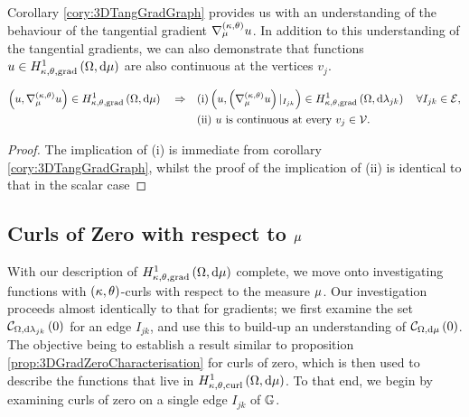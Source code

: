 Corollary \ref{cory:3DTangGradGraph} provides us with an understanding of the behaviour of the tangential gradient $\nabla^{\left( \kappa, \theta \right)}_{\mu}u$.
In addition to this understanding of the tangential gradients, we can also demonstrate that functions $u\in H^1_{\kappa,\theta,\mathrm{grad}}\left( \Omega, \mathrm{d}\mu \right)$ are also continuous at the vertices $v_j$.
\begin{prop} \label{prop:3DVertexContinuity-Grad}
	\begin{align*}
		\left( u, \nabla^{\left( \kappa, \theta \right)}_{\mu}u \right)\in H^1_{\kappa,\theta,\mathrm{grad}}\left( \Omega, \mathrm{d}\mu \right) \quad\Rightarrow\quad
		&\mathrm{(i)} \left( u, \left( \nabla^{\left( \kappa, \theta \right)}_{\mu} u \right)\vert_{I_{jk}}  \right)\in H^1_{\kappa,\theta,\mathrm{grad}}\left( \Omega, \mathrm{d}\lambda_{jk} \right) \quad \forall I_{jk}\in\mathcal{E}, \\
		&\mathrm{(ii)} \ u \text{ is continuous at every } v_j\in\mathcal{V}.
	\end{align*}
\end{prop}
\begin{proof}
	The implication of (i) is immediate from corollary \ref{cory:3DTangGradGraph}, whilst the proof of the implication of (ii) is identical to that in the scalar case 
\end{proof}

\subsection{Curls of Zero with respect to $\mu$} \label{apps:CurlsOfZero}
With our description of $H^1_{\kappa,\theta,\mathrm{grad}}\left( \Omega, \mathrm{d}\mu \right)$ complete, we move onto investigating functions with $\left( \kappa, \theta \right)$-curls with respect to the measure $\mu$.
Our investigation proceeds almost identically to that for gradients; we first examine the set $\mathcal{C}_{ \Omega, \mathrm{d}\lambda_{jk}}\left( 0 \right)$ for an edge $I_{jk}$, and use this to build-up an understanding of $\mathcal{C}_{ \Omega, \mathrm{d}\mu}\left( 0 \right)$.
The objective being to establish a result similar to proposition \ref{prop:3DGradZeroCharacterisation} for curls of zero, which is then used to describe the functions that live in $H^1_{\kappa,\theta,\mathrm{curl}}\left( \Omega, \mathrm{d}\mu \right)$.
To that end, we begin by examining curls of zero on a single edge $I_{jk}$ of $\mathbb{G}$.


